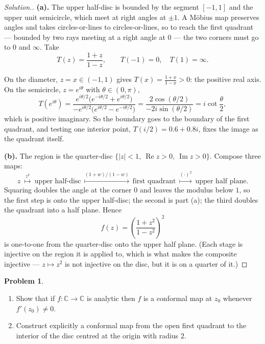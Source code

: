 \documentclass[11pt,a4paper]{article}
\theoremstyle{definition}
\newtheorem{problemx}{Problem}[section]
\newenvironment{problem}{\begin{problemx}}{\end{problemx}}
\newenvironment{solution}
  {\renewcommand{\qedsymbol}{}\begin{proof}[\textit{Solution}.]}
  {\end{proof}}
\begin{document}
\begin{solution}
\textbf{(a).} The upper half-disc is bounded by the segment $[-1,1]$ and the upper
unit semicircle, which meet at right angles at $\pm 1$. A M\"obius map preserves
angles and takes circles-or-lines to circles-or-lines, so to reach the first
quadrant --- bounded by two rays meeting at a right angle at $0$ --- the two corners
must go to $0$ and $\infty$. Take
$$T(z) = \frac{1+z}{1-z},\qquad T(-1) = 0,\quad T(1) = \infty .$$

On the diameter, $z = x \in (-1,1)$ gives $T(x) = \frac{1+x}{1-x} > 0$: the
positive real axis. On the semicircle, $z = e^{i\theta}$ with
$\theta \in (0,\pi)$,
$$T(e^{i\theta})
= \frac{e^{i\theta/2}\big(e^{-i\theta/2}+e^{i\theta/2}\big)}
        {-e^{i\theta/2}\big(e^{i\theta/2}-e^{-i\theta/2}\big)}
= \frac{2\cos(\theta/2)}{-2i\sin(\theta/2)}
= i\cot\frac{\theta}{2},$$
which is positive imaginary. So the boundary goes to the boundary of the first
quadrant, and testing one interior point, $T(i/2) = 0.6 + 0.8i$, fixes the image
as the quadrant itself.

\textbf{(b).} The region is the quarter-disc
$\{\left|z\right|<1,\ \operatorname{Re}z>0,\ \operatorname{Im}z>0\}$. Compose
three maps:
$$z \ \overset{z^2}{\longmapsto}\ \text{upper half-disc}
\ \overset{(1+w)/(1-w)}{\longmapsto}\ \text{first quadrant}
\ \overset{(\cdot)^2}{\longmapsto}\ \text{upper half plane}.$$
Squaring doubles the angle at the corner $0$ and leaves the modulus below $1$, so
the first step is onto the upper half-disc; the second is part (a); the third
doubles the quadrant into a half plane. Hence
$$\boxed{f(z) = \left(\frac{1+z^2}{1-z^2}\right)^{2}}$$
is one-to-one from the quarter-disc onto the upper half plane. (Each stage is
injective on the region it is applied to, which is what makes the composite
injective --- $z \mapsto z^2$ is not injective on the disc, but it is on a
quarter of it.)
\end{solution}


\begin{problem}
\begin{enumerate}
\item[(a).] Show that if $f : \mathbb{C} \rightarrow \mathbb{C}$ is analytic then
$f$ is a conformal map at $z_0$ whenever $f'(z_0) \neq 0$.
\item[(b).] Construct explicitly a conformal map from the open first quadrant to
the interior of the disc centred at the origin with radius $2$.
\end{enumerate}
\end{problem}
\end{document}
